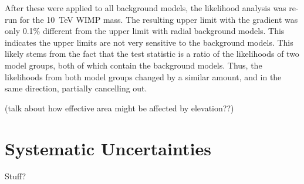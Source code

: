   After these were applied to all background models, the likelihood analysis was re-run for the \SI{10}{\TeV} WIMP mass.
  The resulting upper limit with the gradient was only 0.1\% different from the upper limit with radial background models.
  This indicates the upper limits are not very sensitive to the background models.
  This likely stems from the fact that the test statistic is a ratio of the likelihoods of two model groups, both of which contain the background models.
  Thus, the likelihoods from both model groups changed by a similar amount, and in the same direction, partially cancelling out.
  
  {\color{red}(talk about how effective area might be affected by elevation??)}

\section{Systematic Uncertainties}  

Stuff?


